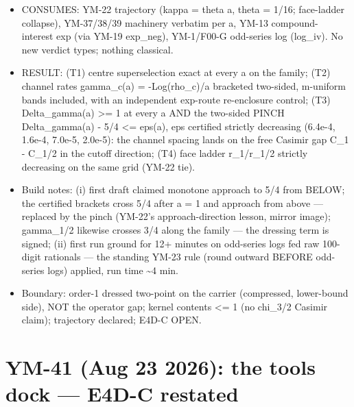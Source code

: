 \begin{itemize}
\tightlist
\item
  CONSUMES: YM-22 trajectory (kappa = theta a, theta = 1/16; face-ladder
  collapse), YM-37/38/39 machinery verbatim per a, YM-13 compound-
  interest exp (via YM-19 exp\_neg), YM-1/F00-G odd-series log (log\_iv).
  No new verdict types; nothing classical.
\item
  RESULT: (T1) centre superselection exact at every a on the family;
  (T2) channel rates gamma\_c(a) = -Log(rho\_c)/a bracketed two-sided,
  m-uniform bands included, with an independent exp-route re-enclosure
  control; (T3) Delta\_gamma(a) \textgreater= 1 at every a AND the two-sided PINCH
  \textbar Delta\_gamma(a) - 5/4\textbar{} \textless= eps(a), eps certified strictly decreasing
  (6.4e-4, 1.6e-4, 7.0e-5, 2.0e-5): the channel spacing lands on the
  free Casimir gap C\_1 - C\_1/2 in the cutoff direction; (T4) face
  ladder r\_1/r\_1/2 strictly decreasing on the same grid (YM-22 tie).
\item
  Build notes: (i) first draft claimed monotone approach to 5/4 from
  BELOW; the certified brackets cross 5/4 after a = 1 and approach from
  above --- replaced by the pinch (YM-22's approach-direction lesson,
  mirror image); gamma\_1/2 likewise crosses 3/4 along the family ---
  the dressing term is signed; (ii) first run ground for 12+ minutes on
  odd-series logs fed raw 100-digit rationals --- the standing YM-23 rule
  (round outward BEFORE odd-series logs) applied, run time \textasciitilde4 min.
\item
  Boundary: order-1 dressed two-point on the carrier (compressed,
  lower-bound side), NOT the operator gap; kernel contents \textless= 1 (no
  chi\_3/2 Casimir claim); trajectory declared; E4D-C OPEN.
\end{itemize}

\hypertarget{ym-41-aug-23-2026-the-tools-dock-e4d-c-restated}{%
\section{YM-41 (Aug 23 2026): the tools dock --- E4D-C restated}\label{ym-41-aug-23-2026-the-tools-dock-e4d-c-restated}}

